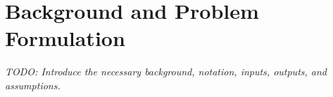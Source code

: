 \section{Background and Problem Formulation}
\label{sec:background}
\textit{TODO: Introduce the necessary background, notation, inputs,
outputs, and assumptions.}
